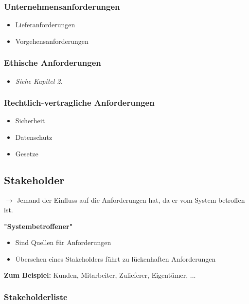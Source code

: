 \documentclass[11pt, a4paper]{article}
\begin{document}
\subsubsection*{Unternehmensanforderungen}
\begin{itemize}
    \item Lieferanforderungen
    \item Vorgehensanforderungen
\end{itemize}

\subsubsection*{Ethische Anforderungen}
\begin{itemize}
    \item \textit{Siehe Kapitel 2.}
\end{itemize}

\subsubsection*{Rechtlich-vertragliche Anforderungen}
\begin{itemize}
    \item Sicherheit
    \item Datenschutz
    \item Gesetze
\end{itemize}

\newpage


\subsection{Stakeholder}

$ \rightarrow $ Jemand der Einfluss auf die Anforderungen hat, da er vom System betroffen ist.

\textbf{"Systembetroffener"}

\begin{itemize}
    \item Sind Quellen für Anforderungen
    \item Übersehen eines Stakeholders führt zu lückenhaften Anforderungen
\end{itemize}

\textbf{Zum Beispiel:} Kunden, Mitarbeiter, Zulieferer, Eigentümer, ...

\subsubsection{Stakeholderliste}
\end{document}

